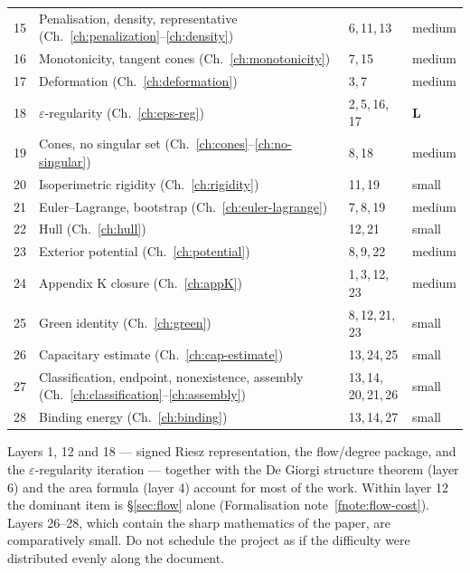 \begin{longtable}{@{}p{}p{}p{}p{}@{}}
15 & Penalisation, density, representative (Ch.~\ref{ch:penalization}--\ref{ch:density}) & 6,\,11,\,13 & medium \\
16 & Monotonicity, tangent cones (Ch.~\ref{ch:monotonicity}) & 7,\,15 & medium \\
17 & Deformation (Ch.~\ref{ch:deformation}) & 3,\,7 & medium \\
18 & $\varepsilon$-regularity (Ch.~\ref{ch:eps-reg}) & 2,\,5,\,16,\,17 & \textbf{L} \\
19 & Cones, no singular set (Ch.~\ref{ch:cones}--\ref{ch:no-singular}) & 8,\,18 & medium \\
20 & Isoperimetric rigidity (Ch.~\ref{ch:rigidity}) & 11,\,19 & small \\
21 & Euler--Lagrange, bootstrap (Ch.~\ref{ch:euler-lagrange}) & 7,\,8,\,19 & medium \\
22 & Hull (Ch.~\ref{ch:hull}) & 12,\,21 & small \\
23 & Exterior potential (Ch.~\ref{ch:potential}) & 8,\,9,\,22 & medium \\
24 & Appendix K closure (Ch.~\ref{ch:appK}) & 1,\,3,\,12,\,23 & medium \\
25 & Green identity (Ch.~\ref{ch:green}) & 8,\,12,\,21,\,23 & small \\
26 & Capacitary estimate (Ch.~\ref{ch:cap-estimate}) & 13,\,24,\,25 & small \\
27 & Classification, endpoint, nonexistence, assembly (Ch.~\ref{ch:classification}--\ref{ch:assembly}) & 13,\,14,\,20,\,21,\,26 & small \\
28 & Binding energy (Ch.~\ref{ch:binding}) & 13,\,14,\,27 & small \\
\bottomrule
\end{longtable}

\begin{fnote}\label{fnote:three-costs}
Layers 1, 12 and 18 --- signed Riesz representation, the
flow/degree package, and the $\varepsilon$-regularity iteration ---
together with the De Giorgi structure theorem (layer 6) and the area formula
(layer 4) account for most of the work.  Within layer 12 the dominant item is
\S\ref{sec:flow} alone (Formalisation note~\ref{fnote:flow-cost}).  Layers 26--28, which contain the
sharp mathematics of the paper, are comparatively small.  Do not schedule the
project as if the difficulty were distributed evenly along the document.
\end{fnote}

